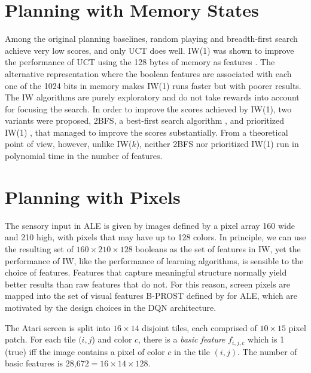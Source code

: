 \documentclass[letterpaper]{article}
\newcommand{\CHECK}[1]{\textcolor{red}{\bf *** #1 ***}}
\begin{document}
\section{Planning  with Memory  States}

Among the  original planning baselines,
random playing and breadth-first search
achieve very  low scores, and only UCT \cite{uct}
does well.  IW(1) was shown to improve the performance
of UCT using the 128 bytes of memory as features \cite{nir:ijcai2015}.
The alternative representation where the boolean features
are associated with each one of the  1024 bits in memory
makes  IW(1)  runs  faster but with poorer results.
The IW algorithms  are purely exploratory  and do not take rewards into account
for focusing the search. In order  to improve the scores achieved by IW(1),
two variants  were proposed,  2BFS, a best-first search algorithm
\cite{nir:ijcai2015}, and prioritized IW(1)  \cite{carmel:ijcai2016},
that managed to improve the scores substantially.  From a theoretical point of view,
however, unlike  IW($k$), neither 2BFS nor prioritized IW(1) run in polynomial time in the number of features.

\section{Planning with Pixels}

The sensory input in ALE is given by images defined by a pixel array 160 wide and 210 high, with
pixels that  may have up to 128 colors. In principle, we can use the resulting set of
$160 \times 210 \times 128$ booleans
as the set of features in IW, yet
the performance of IW, like the performance of learning algorithms,
is sensible to the choice of features. Features that capture
meaningful structure  normally yield better results than raw
features that do not. For this reason, screen pixels are mapped  into the
set of visual features B-PROST defined by \citeauthor{shallow} for ALE, %
which are motivated by the design choices in the DQN architecture.

The Atari screen is split into $16 \times 14$ disjoint tiles, each comprised of  $10 \times 15$  pixel patch.
For each tile $(i,j$) and color $c$, there is a \emph{basic feature}
$f_{i,j,c}$ which is 1 (true) iff the image contains a
pixel of color $c$ in the tile $(i,j)$.
The number of basic features is $\text{28,672} = 16 \times 14 \times 128$.
\end{document}

